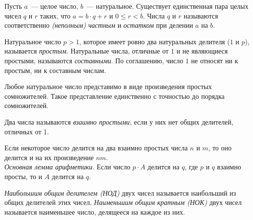 
Пусть $a$~--- целое число, $b$~--- натуральное.
Существует единственная пара целых чисел $q$ и $r$ таких, что
$a = b \cdot q + r$ и $0 \leq r < b$.
Числа $q$ и $r$ называются соответственно
\emph{(неполным) частным} и \emph{остатком} при делении $a$ на $b$.

Натуральное число $p > 1$, которое имеет ровно два натуральных делителя
($1$ и $p$), называется \emph{простым}.
Натуральные числа, отличные от $1$ и не являющиеся простыми, называются
\emph{составными}.
По соглашению, число $1$ не относят ни к простым, ни к составным числам.

Любое натуральное число представимо в виде произведения простых сомножителей.
Такое представление единственно с точностью до порядка сомножителей.

Два числа называются \emph{взаимно простыми}, если у них нет общих делителей,
отличных от 1.

\begin{problems}

\item
\sbp
Если некоторое число делится на два взаимно простых числа $n$ и $m$, то оно
делится и на их произведение $nm$.
\\
\sbp\emph{Основная лемма арифметики.}
Если число $p \cdot A$ делится на $q$, где $p$ и $q$ взаимно просты, то и $A$
делится на $q$.

\end{problems}

\emph{Наибольшим общим делителем (НОД)}
двух чисел называется наибольший из общих делителей этих чисел.
\emph{Наименьшим общим кратным (НОК)}
двух чисел называется наименьшее число, делящееся на каждое из них.

